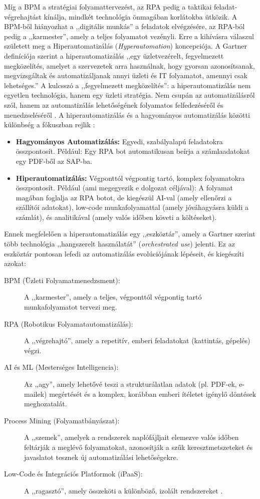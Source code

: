 Míg a BPM a stratégiai folyamattervezést, az RPA pedig a taktikai feladat-végrehajtást kínálja, mindkét technológia önmagában korlátokba ütközik.
A BPM-ből hiányozhat a ,,digitális munkás'' a feladatok elvégzésére, az RPA-ból pedig a ,,karmester'', amely a teljes folyamatot vezényli.
Erre a kihívásra válaszul született meg a Hiperautomatizálás (\textit{Hyperautomation}) koncepciója.
A Gartner \cite{Gartner-Hyperautomation} definíciója szerint a hiperautomatizálás ,,egy üzletvezérelt, fegyelmezett megközelítés, amelyet a szervezetek arra használnak, hogy gyorsan azonosítsanak, megvizsgáltak és automatizáljanak annyi üzleti és IT folyamatot, amennyi csak lehetséges.'' A kulcsszó a ,,fegyelmezett megközelítés'': a hiperautomatizálás nem egyetlen technológia, hanem egy üzleti stratégia.
Nem csupán az automatizálásról szól, hanem az automatizálás lehetőségének folyamatos felfedezéséről és menedzseléséről \cite{Kissflow-Hyperautomation}.
A hiperautomatizálás és a hagyományos automatizálás közötti különbség a fókuszban rejlik \cite{Kissflow-Hyperautomation}:
\begin{itemize}
    \item \textbf{Hagyományos Automatizálás:} Egyedi, szabályalapú feladatokra összpontosít.
Például: Egy RPA bot automatikusan beírja a számlaadatokat egy PDF-ből az SAP-ba.
    \item \textbf{Hiperautomatizálás:} Végponttól végpontig tartó, komplex folyamatokra összpontosít.
Például (ami megegyezik e dolgozat céljával): A folyamat magában foglalja az RPA botot, de kiegészül AI-val (amely ellenőrzi a szállítói adatokat), low-code munkafolyamattal (amely jóváhagyásra küldi a számlát), és analitikával (amely valós időben követi a költéseket).
\end{itemize}

Ennek megfelelően a hiperautomatizálás egy ,,eszköztár'', amely a Gartner \cite{Gartner-Hyperautomation} szerint több technológia ,,hangszerelt használatát'' (\textit{orchestrated use}) jelenti.
Ez az eszköztár pontosan lefedi az automatizálás evolúciójának lépéseit, és kiegészíti azokat:
\begin{description}
    \item[BPM (Üzleti Folyamatmenedzsment):] A ,,karmester'', amely a teljes, végponttól végpontig tartó munkafolyamatot tervezi meg.
    \item[RPA (Robotikus Folyamatautomatizálás):] A ,,végrehajtó'', amely a repetitív, emberi feladatokat (kattintás, gépelés) végzi.
    \item[AI és ML (Mesterséges Intelligencia):] Az ,,agy'', amely lehetővé teszi a strukturálatlan adatok (pl. PDF-ek, e-mailek) megértését és a komplex, korábban emberi ítéletet igénylő döntések meghozatalát.
    \item[Process Mining (Folyamatbányászat):] A ,,szemek'', amelyek a rendszerek naplófájljait elemezve valós időben feltárják a meglévő folyamatokat, azonosítják a szűk keresztmetszeteket és javaslatot tesznek új automatizálási lehetőségekre.
    \item[Low-Code és Integrációs Platformok (iPaaS):] A ,,ragasztó'', amely összeköti a különböző, izolált rendszereket \cite{Kissflow-Hyperautomation}.
\end{description}

